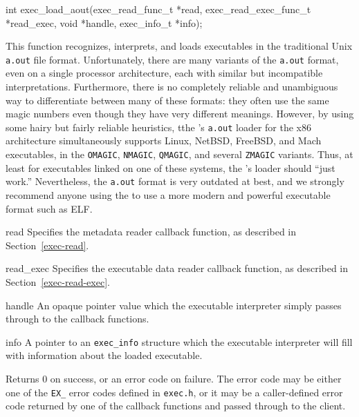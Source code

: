 \begin{apisyn}

	\funcproto int exec_load_aout(exec_read_func_t *read,
				 exec_read_exec_func_t *read_exec,
				 void *handle, \outparam exec_info_t *info);
\end{apisyn}
\begin{apidesc}
	This function recognizes, interprets, and loads executables
	in the traditional Unix \texttt{a.out} file format.
	Unfortunately, there are many variants of the \texttt{a.out} format,
	even on a single processor architecture,
	each with similar but incompatible interpretations.
	Furthermore,
	there is no completely reliable and unambiguous way
	to differentiate between many of these formats:
	they often use the same magic numbers
	even though they have very different meanings.
	However, by using some hairy but fairly reliable heuristics,
	tthe \oskit's \texttt{a.out} loader for the x86 architecture
	simultaneously supports Linux, NetBSD, FreeBSD, and Mach executables,
	in the \texttt{OMAGIC}, \texttt{NMAGIC}, \texttt{QMAGIC},
	and several \texttt{ZMAGIC} variants.
	Thus, at least for executables linked on one of these systems,
	the \oskit's loader should ``just work.''
	Nevertheless, the \texttt{a.out} format is very outdated at best,
	and we strongly recommend anyone using the \oskit{}
	to use a more modern and powerful executable format such as ELF.
\end{apidesc}
\begin{apiparm}
	\item[read]
		Specifies the metadata reader callback function,
		as described in Section~\ref{exec-read}.
	\item[read_exec]
		Specifies the executable data reader callback function,
		as described in Section~\ref{exec-read-exec}.
	\item[handle]
		An opaque pointer value
		which the executable interpreter
		simply passes through to the callback functions.
	\item[info]
		A pointer to an \texttt{exec_info} structure
		which the executable interpreter will fill
		with information about the loaded executable.
\end{apiparm}
\begin{apiret}
	Returns 0 on success,
	or an error code on failure.
	The error code may be either
	one of the \texttt{EX_} error codes
	defined in \texttt{exec.h},
	or it may be a caller-defined error code
	returned by one of the callback functions
	and passed through to the client.
\end{apiret}

